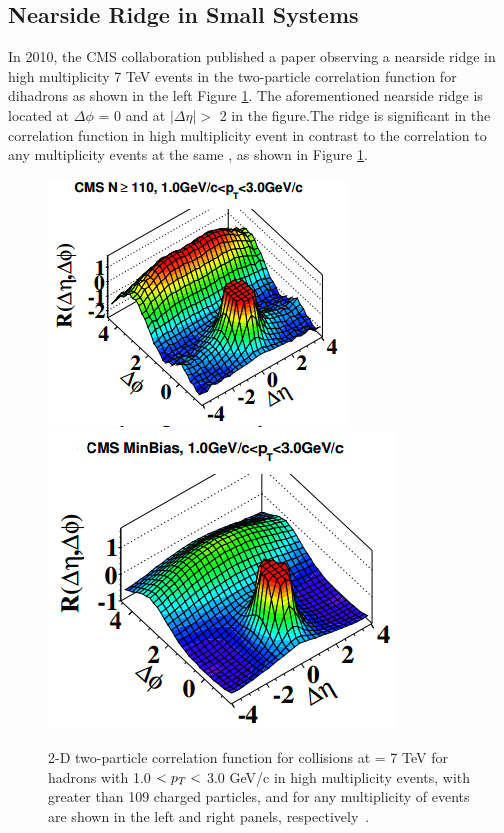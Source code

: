 \subsection{Nearside Ridge in Small Systems}
In 2010, the CMS collaboration published a paper observing a nearside ridge in high multiplicity 7 TeV \pp events in the two-particle correlation function for dihadrons as shown in the left Figure \ref{fig:pp_ridge_plot}. The aforementioned nearside ridge is located at $\Delta\phi$ = 0 and at $|\Delta\eta| > $ 2 in the figure.The ridge is significant in the correlation function in high multiplicity \pp event in contrast to the correlation to any multiplicity \pp events at the same \sqs, as shown in Figure \ref{fig:pp_ridge_plot}. 
\begin{figure}[h!]
\begin{center}
\includegraphics[width=0.47\linewidth]{figs/pp_high_multiplicity_ridge.PNG}
\includegraphics[width=0.47\linewidth]{figs/pp_correlation_function_min_bias.png}
\caption{2-D two-particle correlation function for \pp collisions at \sqs = 7 TeV for hadrons with 1.0 $<\mbox{$p_T$}<$ 3.0 GeV/c in high multiplicity events, with greater than 109 charged particles, and for any multiplicity of events are shown in the left and right panels, respectively~\cite{Khachatryan2010}.}
\label{fig:pp_ridge_plot}
\end{center}
\end{figure}

